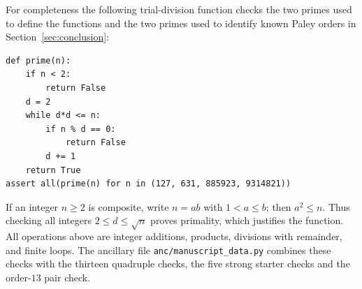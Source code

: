 \documentclass[10pt]{article}
\begin{document}
For completeness the following trial-division function checks the two
primes used to define the functions and the two primes used to identify
known Paley orders in Section~\ref{sec:conclusion}:
\begin{verbatim}
def prime(n):
    if n < 2:
        return False
    d = 2
    while d*d <= n:
        if n % d == 0:
            return False
        d += 1
    return True
assert all(prime(n) for n in (127, 631, 885923, 9314821))
\end{verbatim}
If an integer $n\geq2$ is composite, write $n=ab$ with $1<a\leq b$;
then $a^2\leq n$. Thus checking all integers $2\leq d\leq\sqrt n$
proves primality, which justifies the function. All operations above are
integer additions, products, divisions with remainder, and finite loops.
The ancillary file \texttt{anc/manuscript\_data.py} combines these checks
with the thirteen quadruple checks, the five strong starter checks and
the order-$13$ pair check.
\end{document}
